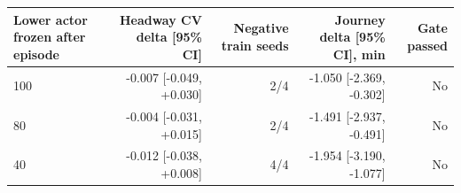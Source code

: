 \begin{tabular}{lrrrr}
\toprule
Lower actor frozen after episode & Headway CV delta [95\% CI] & Negative train seeds & Journey delta [95\% CI], min & Gate passed \\
\midrule
100 & -0.007 [-0.049, +0.030] & 2/4 & -1.050 [-2.369, -0.302] & No \\
80 & -0.004 [-0.031, +0.015] & 2/4 & -1.491 [-2.937, -0.491] & No \\
40 & -0.012 [-0.038, +0.008] & 4/4 & -1.954 [-3.190, -1.077] & No \\
\bottomrule
\end{tabular}
